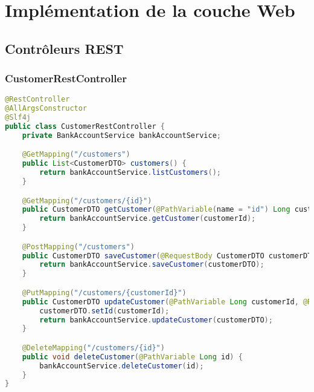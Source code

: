 \documentclass[12pt,a4paper]{report}
\begin{document}
\chapter{Implémentation de la couche Web}
\section{Contrôleurs REST}

\subsection{CustomerRestController}
\begin{lstlisting}[language=Java, caption=CustomerRestController.java]
@RestController
@AllArgsConstructor
@Slf4j
public class CustomerRestController {
    private BankAccountService bankAccountService;

    @GetMapping("/customers")
    public List<CustomerDTO> customers() {
        return bankAccountService.listCustomers();
    }

    @GetMapping("/customers/{id}")
    public CustomerDTO getCustomer(@PathVariable(name = "id") Long customerId) throws CustomerNotFoundException {
        return bankAccountService.getCustomer(customerId);
    }

    @PostMapping("/customers")
    public CustomerDTO saveCustomer(@RequestBody CustomerDTO customerDTO) {
        return bankAccountService.saveCustomer(customerDTO);
    }

    @PutMapping("/customers/{customerId}")
    public CustomerDTO updateCustomer(@PathVariable Long customerId, @RequestBody CustomerDTO customerDTO) {
        customerDTO.setId(customerId);
        return bankAccountService.updateCustomer(customerDTO);
    }

    @DeleteMapping("/customers/{id}")
    public void deleteCustomer(@PathVariable Long id) {
        bankAccountService.deleteCustomer(id);
    }
}
\end{lstlisting}
\end{document}
